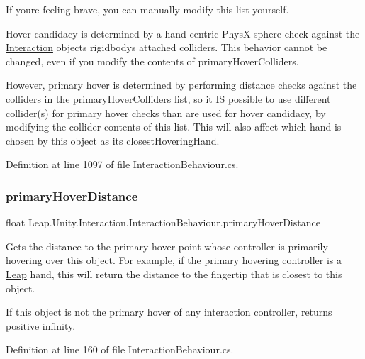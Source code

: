 If you\textquotesingle{}re feeling brave, you can manually modify this list yourself.

Hover candidacy is determined by a hand-\/centric PhysX sphere-\/check against the \mbox{\hyperlink{namespace_leap_1_1_unity_1_1_interaction}{Interaction}} object\textquotesingle{}s rigidbody\textquotesingle{}s attached colliders. This behavior cannot be changed, even if you modify the contents of primary\+Hover\+Colliders.

However, primary hover is determined by performing distance checks against the colliders in the primary\+Hover\+Colliders list, so it IS possible to use different collider(s) for primary hover checks than are used for hover candidacy, by modifying the collider contents of this list. This will also affect which hand is chosen by this object as its closest\+Hovering\+Hand. 

Definition at line 1097 of file Interaction\+Behaviour.\+cs.

\mbox{\label{class_leap_1_1_unity_1_1_interaction_1_1_interaction_behaviour_afad478858c7b7f2e5c6cc38bbbaff535}} 
\subsubsection{\texorpdfstring{primaryHoverDistance}{primaryHoverDistance}}
{\footnotesize\ttfamily float Leap.\+Unity.\+Interaction.\+Interaction\+Behaviour.\+primary\+Hover\+Distance\hspace{0.3cm}{\ttfamily [get]}}



Gets the distance to the primary hover point whose controller is primarily hovering over this object. For example, if the primary hovering controller is a \mbox{\hyperlink{namespace_leap_1_1_unity_1_1_leap}{Leap}} hand, this will return the distance to the fingertip that is closest to this object. 

If this object is not the primary hover of any interaction controller, returns positive infinity. 

Definition at line 160 of file Interaction\+Behaviour.\+cs.


